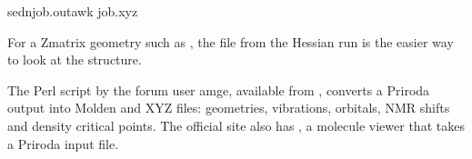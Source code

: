 \documentclass[letterpaper,10pt,english,openany,oneside]{sphinxmanual}
\begin{document}
\begin{sphinxVerbatim}[commandchars=\\\{\}]
sed\PYGZhy{}njob.outawk
\PYGZgt{}job.xyz
\end{sphinxVerbatim}





\sphinxAtStartPar
For a Z\sphinxhyphen{}matrix geometry such as , the  file from the Hessian run is the easier way to look at the
structure.

\sphinxAtStartPar
{} The Perl script  by the forum user amge, available from
, converts a Priroda output into Molden and XYZ files: geometries,
vibrations, orbitals, NMR shifts and density critical points. The official site also has , a molecule viewer
that takes a Priroda input file.
\end{document}
